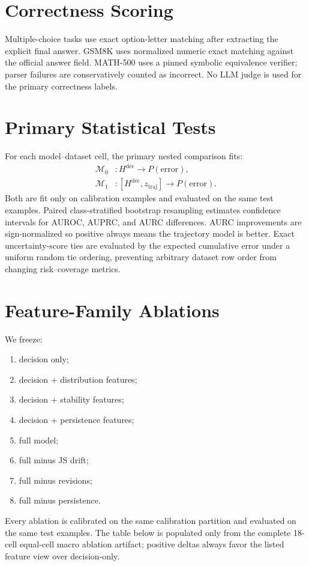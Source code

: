 \section{Correctness Scoring}

Multiple-choice tasks use exact option-letter matching after extracting the explicit final answer.
GSM8K uses normalized numeric exact matching against the official answer field.
MATH-500 uses a pinned symbolic equivalence verifier; parser failures are conservatively counted as incorrect.
No LLM judge is used for the primary correctness labels.

\section{Primary Statistical Tests}

For each model--dataset cell, the primary nested comparison fits:
\begin{align}
\mathcal{M}_0 &: H^{\mathrm{dec}} \rightarrow P(\mathrm{error}),\\
\mathcal{M}_1 &: [H^{\mathrm{dec}}, z_{\mathrm{traj}}] \rightarrow P(\mathrm{error}).
\end{align}
Both are fit only on calibration examples and evaluated on the same test examples.
Paired class-stratified bootstrap resampling estimates confidence intervals for AUROC, AUPRC, and AURC differences.
AURC improvements are sign-normalized so positive always means the trajectory model is better. Exact uncertainty-score ties are evaluated by the expected cumulative error under a uniform random tie ordering, preventing arbitrary dataset row order from changing risk--coverage metrics.

\section{Feature-Family Ablations}

We freeze:
\begin{enumerate}
\item decision only;
\item decision + distribution features;
\item decision + stability features;
\item decision + persistence features;
\item full model;
\item full minus JS drift;
\item full minus revisions;
\item full minus persistence.
\end{enumerate}
Every ablation is calibrated on the same calibration partition and evaluated on the same test examples.
The table below is populated only from the complete 18-cell equal-cell macro ablation artifact; positive deltas always favor the listed feature view over decision-only.

